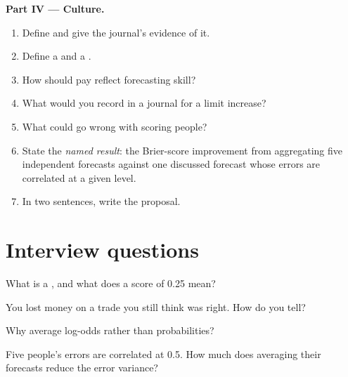 \begin{problem}
\medskip\noindent\textbf{Part IV --- Culture.}
\begin{enumerate}[resume]
\item Define  and give the journal's evidence of it.
\item Define a  and a .
\item How should pay reflect forecasting skill?
\item What would you record in a journal for a limit increase?
\item What could go wrong with scoring people?
\item State the \emph{named result}: the Brier-score improvement from aggregating five independent forecasts against one discussed forecast whose
errors are correlated at a given level.
\item In two sentences, write the proposal.
\end{enumerate}
\end{problem}

\section{Interview questions}

\begin{interviewq}\label{iq:fm:culture-and-decision-making:1}
What is a , and what does a score of 0.25 mean?
\end{interviewq}

\begin{interviewq}\label{iq:fm:culture-and-decision-making:2}
You lost money on a trade you still think was right. How do you tell?
\end{interviewq}

\begin{interviewq}\label{iq:fm:culture-and-decision-making:3}
Why average log-odds rather than probabilities?
\end{interviewq}

\begin{interviewq}\label{iq:fm:culture-and-decision-making:4}
Five people's errors are correlated at 0.5. How much does averaging their forecasts reduce the error variance?
\end{interviewq}

